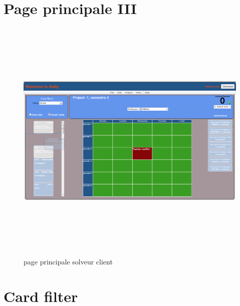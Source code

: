 \newpage

\section{Page principale III}
\label{annexe/espace_nom}

\begin{figure}[!h]
	\begin{center}
		\includegraphics[width=19cm,height=12cm,angle=90]{MainPageColorTab.png}
		\caption{page principale solveur client}
	\end{center}
\end{figure}

\newpage

\section{Card filter}
\label{annexe/espace_nom}

